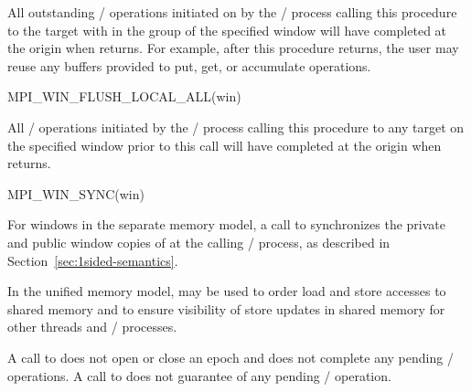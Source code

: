 All outstanding \RMA/ operations
initiated on  by the \mpi/ process calling this procedure to the target with 
in the group of the specified window will have completed at the origin when
 returns. For example, after this procedure returns, the user may
reuse any buffers provided to put, get, or accumulate operations.

%
\begin{funcdef}{MPI\_WIN\_FLUSH\_LOCAL\_ALL}{(\mbox{win})}
\end{funcdef}

All \RMA/ operations initiated by the \mpi/ process calling this procedure to any target on the specified window prior to this call
will have completed at the origin when
 returns.

%
\label{sec:1sided-flush:win-sync}
\begin{funcdef}{MPI\_WIN\_SYNC}{(\mbox{win})}
\end{funcdef}

For windows in the separate memory model,
a call to  synchronizes the private and public window
copies of  at the calling \MPI/ process, as described in Section~\ref{sec:1sided-semantics}.

In the unified memory model,  may be used to
order load and store accesses to shared memory and to ensure visibility of store updates in shared memory
for other threads and \MPI/ processes.

A call to  does not open or close an epoch and does not complete any pending \RMA/ operations.
A call to  does not guarantee
of any pending \MPI/ operation.

